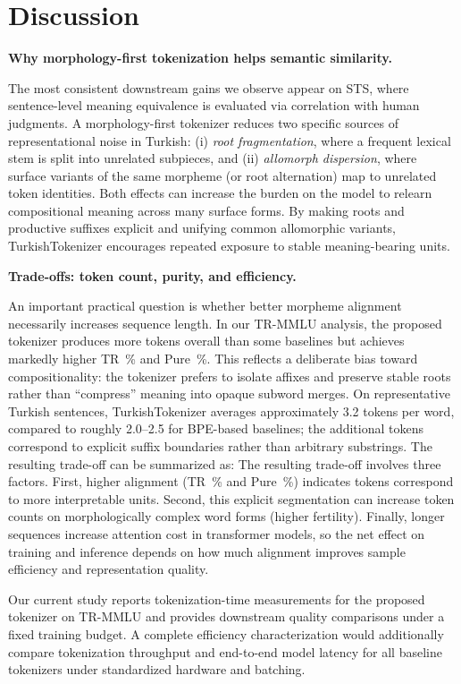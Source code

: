 \section{Discussion}
\label{sec:discussion}

\textbf{Why morphology-first tokenization helps semantic similarity.}

The most consistent downstream gains we observe appear on STS, where sentence-level meaning equivalence is evaluated via correlation with human judgments. A morphology-first tokenizer reduces two specific sources of representational noise in Turkish:
(i) \emph{root fragmentation}, where a frequent lexical stem is split into unrelated subpieces, and
(ii) \emph{allomorph dispersion}, where surface variants of the same morpheme (or root alternation) map to unrelated token identities.
Both effects can increase the burden on the model to relearn compositional meaning across many surface forms. By making roots and productive suffixes explicit and unifying common allomorphic variants, TurkishTokenizer encourages repeated exposure to stable meaning-bearing units.

\textbf{Trade-offs: token count, purity, and efficiency.}

An important practical question is whether better morpheme alignment necessarily increases sequence length. In our TR-MMLU analysis, the proposed tokenizer produces more tokens overall than some baselines but achieves markedly higher TR~\% and Pure~\%. This reflects a deliberate bias toward compositionality: the tokenizer prefers to isolate affixes and preserve stable roots rather than ``compress'' meaning into opaque subword merges. On representative Turkish sentences, TurkishTokenizer averages approximately 3.2 tokens per word, compared to roughly 2.0--2.5 for BPE-based baselines; the additional tokens correspond to explicit suffix boundaries rather than arbitrary substrings. The resulting trade-off can be summarized as:
The resulting trade-off involves three factors. First, higher alignment (TR~\% and Pure~\%) indicates tokens correspond to more interpretable units. Second, this explicit segmentation can increase token counts on morphologically complex word forms (higher fertility). Finally, longer sequences increase attention cost in transformer models, so the net effect on training and inference depends on how much alignment improves sample efficiency and representation quality.

Our current study reports tokenization-time measurements for the proposed tokenizer on TR-MMLU and provides downstream quality comparisons under a fixed training budget. A complete efficiency characterization would additionally compare tokenization throughput and end-to-end model latency for all baseline tokenizers under standardized hardware and batching.

